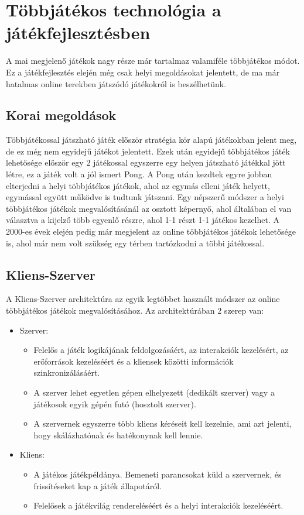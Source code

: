 \documentclass[]{thesis-ekf}
\theoremstyle{definition}
\theoremstyle{remark}
\begin{document}
\section{Többjátékos technológia a játékfejlesztésben}

A mai megjelenő játékok nagy része már tartalmaz valamiféle többjátékos módot. Ez a játékfejlesztés elején még csak helyi megoldásokat jelentett, de ma már hatalmas online terekben játszódó játékokról is beszélhetünk.

\subsection{Korai megoldások}

Többjátékossal játszható játék először stratégia kör alapú játékokban jelent meg, de ez még nem egyidejű játékot jelentett. Ezek után egyidejű többjátékos játék lehetősége először egy 2 játékossal egyszerre egy helyen játszható játékkal jött létre, ez a játék volt a jól ismert Pong. A Pong után kezdtek egyre jobban elterjedni a helyi többjátékos játékok, ahol az egymás elleni játék helyett, egymással együtt működve is tudtunk játszani. Egy népszerű módszer a helyi többjátékos játékok megvalósításánál az osztott képernyő, ahol általában el van választva a kijelző több egyenlő részre, ahol 1-1 részt 1-1 játékos kezelhet. A 2000-es évek elején pedig már megjelent az online többjátékos játékok lehetősége is, ahol már nem volt szükség egy térben tartózkodni a többi játékossal. \cite{MediumMultiplayer}

\subsection{Kliens-Szerver}

A Kliens-Szerver architektúra az egyik legtöbbet használt módszer az online többjátékos játékok megvalósításához. Az architektúrában 2 szerep van:

\begin{itemize}
	\item Szerver:
	\begin{itemize}
		\item Felelős a játék logikájának feldolgozásáért, az interakciók kezelésért, az erőforrások kezeléséért és a kliensek közötti információk szinkronizálásáért.
		\item A szerver lehet egyetlen gépen elhelyezett (dedikált szerver) vagy a játékosok egyik gépén futó (hosztolt szerver).
		\item A szervernek egyszerre több kliens kéréseit kell kezelnie, ami azt jelenti, hogy skálázhatónak és hatékonynak kell lennie.
	\end{itemize}
	\item Kliens:
	\begin{itemize}
		\item A játékos játékpéldánya. Bemeneti parancsokat küld a szervernek, és frissítéseket kap a játék állapotáról.
		\item Felelősek a játékvilág rendereléséért és a helyi interakciók kezeléséért.
	\end{itemize}
\end{itemize}
\end{document}
